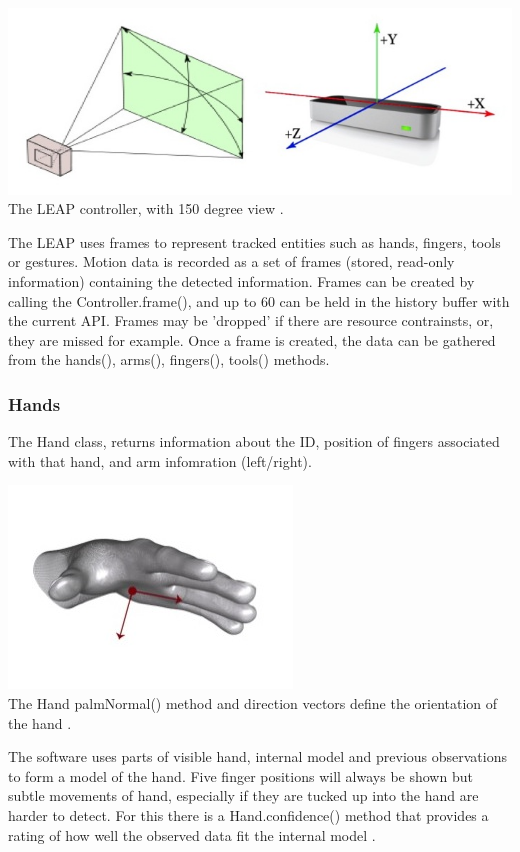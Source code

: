\documentclass[10pt]{article}
\begin{document}
\begin{center}
\includegraphics[scale=0.5]{leap}\\
The LEAP controller, with 150 degree view \cite{leap}.
\end{center}

The LEAP uses frames to represent tracked entities such as hands, fingers, tools or gestures. Motion data is recorded as a set of frames (stored, read-only information) containing the detected information. 
Frames can be created by calling the Controller.frame(), and up to 60 can be held in the history buffer with the current API. Frames may be 'dropped' if there are resource contrainsts, or, they are missed for example. Once a frame is created, the data can be gathered from the hands(), arms(), fingers(), tools() methods.

\subsubsection{Hands}
The Hand class, returns information about the ID, position of fingers associated with that hand, and arm infomration (left/right).

\begin{center}
\includegraphics[scale=0.6]{palm}\\
The Hand palmNormal() method and direction vectors define the orientation of the hand \cite{leap}.
\end{center}

The software uses parts of visible hand, internal model and previous observations to form a model of the hand. Five finger positions will always be shown but subtle movements of hand, especially if they are tucked up into the hand are harder to detect. For this there is a Hand.confidence() method that provides a rating of how well the observed data fit the internal model \cite{leap}.
\end{document}

